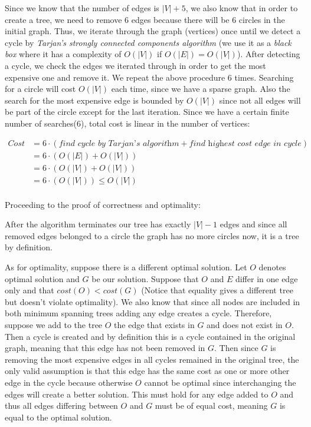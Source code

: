Since we know that the number of edges is $|V| + 5$, we also know that in order to create a tree, we need to remove 6 edges because there will be 6 circles in the initial graph. Thus, we iterate through the graph (vertices) once until we detect a cycle by \textit{Tarjan's strongly connected components algorithm} (we use it as a \textit{black box} where it has a complexity of $O(|V|)$ if $O(|E|) = O(|V|)$). After detecting a cycle, we check the edges we iterated through in order to get the most expensive one and remove it. We repeat the above procedure 6 times. Searching for a circle will cost $O(|V|)$ each time, since we have a sparse graph. Also the search for the most expensive edge is bounded by $O(|V|)$ since not all edges will be part of the circle except for the last iteration. Since we have a certain finite number of searches(6), total cost is linear in the number of vertices:

\begin{align*}
  Cost &= 6 \cdot (\textit{find cycle by Tarjan's algorithm} + \textit{find highest cost edge in cycle}) \\
       &= 6 \cdot (O(|E|) + O(|V|)) \\
       &= 6 \cdot (O(|V|) + O(|V|)) \\
       &= 6 \cdot (O(|V|)) \leq O(|V|) \\
\end{align*}

Proceeding to the proof of correctness and optimality:

After the algorithm terminates our tree has exactly $|V|-1$ edges and since all removed edges belonged to a circle the graph has no more circles now, it is a tree by definition. 

As for optimality, suppose there is a different optimal solution. Let $O$ denotes optimal solution and $G$ be our solution. Suppose that $O$ and $E$ differ in one edge only and that $cost(O) < cost(G)$ (Notice that equality gives a different tree but doesn't violate optimality). We also know that since all nodes are included in both minimum spanning trees adding any edge creates a cycle. Therefore, suppose we add to the tree $O$ the edge that exists in $G$ and does not exist in $O$. Then a cycle is created and by definition this is a cycle contained in the original graph, meaning that this edge has not been removed in $G$. Then since $G$ is removing the most expensive edges in all cycles remained in the original tree, the only valid assumption is that this edge has the same cost as one or more other edge in the cycle because otherwise $O$ cannot be optimal since interchanging the edges will create a better solution. This must hold for any edge added to $O$ and thus all edges differing between $O$ and $G$ must be of equal cost, meaning $G$ is equal to the optimal solution.